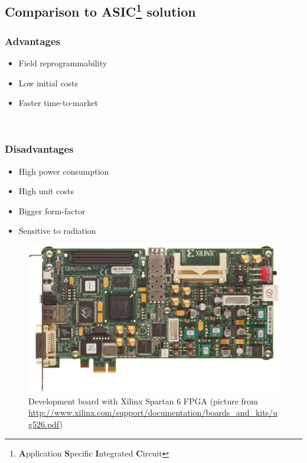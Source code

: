 \documentclass[a4paper, landscape, twocolumn, 11pt]{article}
\begin{document}
\subsection*{Comparison to ASIC\footnote{
    \textbf{A}pplication \textbf{S}pecific 
    \textbf{I}ntegrated \textbf{C}ircuit} solution}
\noindent
\begin{minipage}{0.485\linewidth}
    \subsubsection*{Advantages}
    \begin{itemize}
        \item Field reprogrammability
        \item Low initial costs
        \item Faster time-to-market
    \end{itemize}
\end{minipage}
\begin{minipage}{0.02\linewidth}
    ~
\end{minipage}
\begin{minipage}{0.485\linewidth}
    \subsubsection*{Disadvantages}
    \begin{itemize}
        \item High power consumption
        \item High unit costs
        \item Bigger form-factor
        \item Sensitive to radiation
    \end{itemize}
\end{minipage}

\begin{figure}[h!]
    \vspace{11pt}
    \centering
    \includegraphics[width=0.8\linewidth]{fig/sp605.png}
    \caption{Development board with Xilinx Spartan 6 FPGA (picture from 
        \url{http://www.xilinx.com/support/documentation/boards_and_kits/ug526.pdf})}
    \label{fig:devboard}
\end{figure}

\nocite{*}

\end{document}
